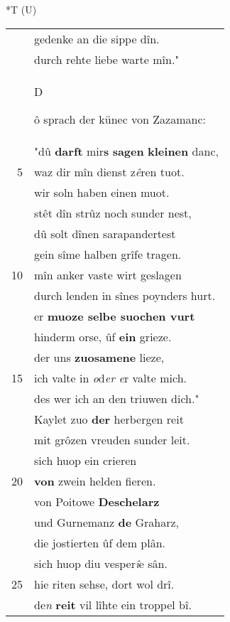 \documentclass[8pt,a4paper,notitlepage]{article}
\begin{document}
\begin{table}[ht]
\begin{minipage}[t]{0.5\linewidth}
\end{minipage}
\hspace{0.5cm}
\begin{minipage}[t]{0.5\linewidth}
\small
\begin{center}*T (U)
\end{center}
\begin{tabular}{rl}
 & gedenke an die sippe dîn.\\ 
 & durch rehte liebe warte mîn."\\ 
 & \begin{large}D\end{large}ô sprach der künec von Zazamanc:\\ 
 & "dû \textbf{darft} mir\textbf{s} \textbf{sagen} \textbf{kleinen} danc,\\ 
5 & waz dir mîn dienst z\textit{ê}ren tuot.\\ 
 & wir soln haben einen muot.\\ 
 & stêt dîn strûz noch sunder nest,\\ 
 & dû solt dînen sarapandertest\\ 
 & gein sîme halben grîfe tragen.\\ 
10 & mîn anker vaste wirt geslagen\\ 
 & durch lenden in sînes poynders hurt.\\ 
 & er \textbf{muoze selbe suochen vurt}\\ 
 & hinderm orse, ûf \textbf{ein} grieze.\\ 
 & der uns \textbf{zuosamene} lieze,\\ 
15 & ich valte in \textit{o}d\textit{er e}r valte mich.\\ 
 & des wer ich an den triuwen dich."\\ 
 & Kaylet zuo \textbf{der} herbergen reit\\ 
 & mit grôzen vreuden sunder leit.\\ 
 & sich huop ein crieren\\ 
20 & \textbf{von} zwein helden fieren.\\ 
 & von Poitowe \textbf{Deschelarz}\\ 
 & und Gurnemanz \textbf{de} Graharz,\\ 
 & die jostierten ûf dem plân.\\ 
 & sich huop diu vesper\textit{î}e sân.\\ 
25 & hie riten sehse, dort wol drî.\\ 
 & de\textit{n} \textbf{reit} vil lîhte ein troppel bî.\\ 

\end{tabular}
\end{minipage}
\end{table}
\end{document}
